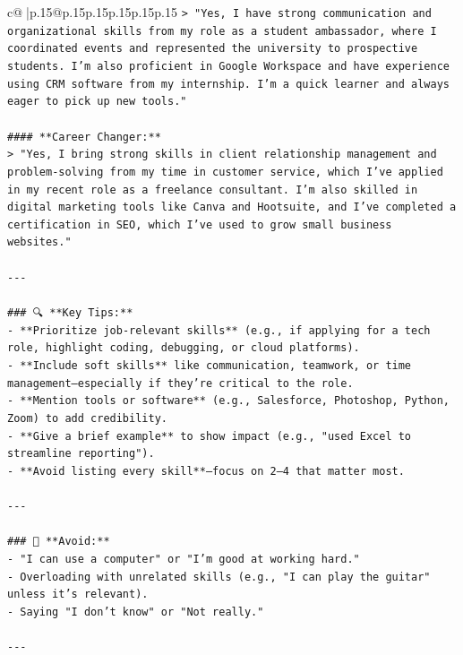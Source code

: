 \documentclass{article}
\begin{document}
{\begin{supertabular}{c@{$\;$}|p{.15\linewidth}@{}p{.15\linewidth}p{.15\linewidth}p{.15\linewidth}p{.15\linewidth}p{.15\linewidth}}
{{{\texttt{> "Yes, I have strong communication and organizational skills from my role as a student ambassador, where I coordinated events and represented the university to prospective students. I’m also proficient in Google Workspace and have experience using CRM software from my internship. I’m a quick learner and always eager to pick up new tools."} \\
\\ 
\texttt{\#\#\#\# **Career Changer:**} \\
\texttt{> "Yes, I bring strong skills in client relationship management and problem{-}solving from my time in customer service, which I’ve applied in my recent role as a freelance consultant. I’m also skilled in digital marketing tools like Canva and Hootsuite, and I’ve completed a certification in SEO, which I’ve used to grow small business websites."} \\
\\ 
\texttt{{-}{-}{-}} \\
\\ 
\texttt{\#\#\# 🔍 **Key Tips:**} \\
\texttt{{-} **Prioritize job{-}relevant skills** (e.g., if applying for a tech role, highlight coding, debugging, or cloud platforms).} \\
\texttt{{-} **Include soft skills** like communication, teamwork, or time management—especially if they’re critical to the role.} \\
\texttt{{-} **Mention tools or software** (e.g., Salesforce, Photoshop, Python, Zoom) to add credibility.} \\
\texttt{{-} **Give a brief example** to show impact (e.g., "used Excel to streamline reporting").} \\
\texttt{{-} **Avoid listing every skill**—focus on 2–4 that matter most.} \\
\\ 
\texttt{{-}{-}{-}} \\
\\ 
\texttt{\#\#\# 🚫 **Avoid:**} \\
\texttt{{-} "I can use a computer" or "I’m good at working hard."} \\
\texttt{{-} Overloading with unrelated skills (e.g., "I can play the guitar" unless it’s relevant).} \\
\texttt{{-} Saying "I don’t know" or "Not really."} \\
\\ 
\texttt{{-}{-}{-}} \\
\\ 
}}}
\end{supertabular}}
\end{document}
